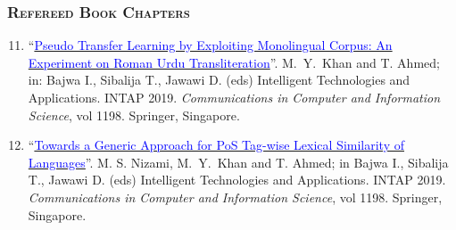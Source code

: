 \documentclass[a4paper, 10pt]{article}
\begin{document}
\subsubsection*{\textsc{Refereed Book Chapters}}
\begin{enumerate}
\setcounter{enumi}{10}
\itemsep-4pt
\item ``\href{https://doi.org/10.1007/978-981-15-5232-8_36}{\textcolor{blue}{Pseudo Transfer Learning by Exploiting Monolingual Corpus: An Experiment on Roman Urdu Transliteration}}''. \textcolor{NavyBlue}{M.~Y.~Khan} and T. Ahmed; in: Bajwa I., Sibalija T., Jawawi D. (eds) Intelligent Technologies and Applications. INTAP 2019. \emph{Communications in Computer and Information Science}, vol 1198. Springer, Singapore.

\item ``\href{https://doi.org/10.1007/978-981-15-5232-8_42}{\textcolor{blue}{Towards a Generic Approach for PoS Tag-wise Lexical Similarity of Languages}}''. M. S. Nizami, \textcolor{NavyBlue}{M.~Y.~Khan} and T. Ahmed; in Bajwa I., Sibalija T., Jawawi D. (eds) Intelligent Technologies and Applications. INTAP 2019. \emph{Communications in Computer and Information Science}, vol 1198. Springer, Singapore.

\end{enumerate}
\end{document}
